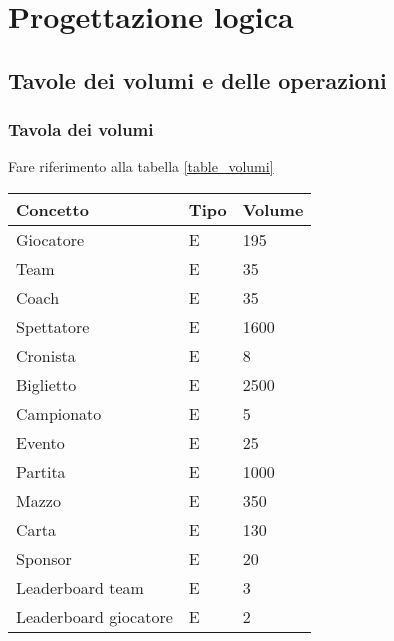 \documentclass{article}
\begin{document}
\section{Progettazione logica}

\subsection{Tavole dei volumi e delle operazioni}
\subsubsection{Tavola dei volumi}

Fare riferimento alla tabella \ref{table_volumi}

\begin{table}
\centering
\begin{tabularx}{\textwidth}{|l|X|X|}
\hline 
\textbf{Concetto} & \textbf{Tipo} & \textbf{Volume} \\ \hline
Giocatore & E & 195 \\ \hline %
Team & E & 35 \\ \hline %
Coach & E & 35 \\ \hline %
Spettatore & E & 1600 \\ \hline %
Cronista & E & 8 \\ \hline %
Biglietto & E & 2500 \\ \hline %
Campionato & E & 5 \\ \hline %
Evento & E & 25 \\ \hline %
Partita & E & 1000 \\ \hline  %
Mazzo & E & 350 \\ \hline %
Carta & E & 130 \\ \hline %
Sponsor & E & 20 \\ \hline %
Leaderboard team & E & 3 \\ \hline %
Leaderboard giocatore & E & 2 \\ \hline %


\end{tabularx}
\end{table}
\end{document}
